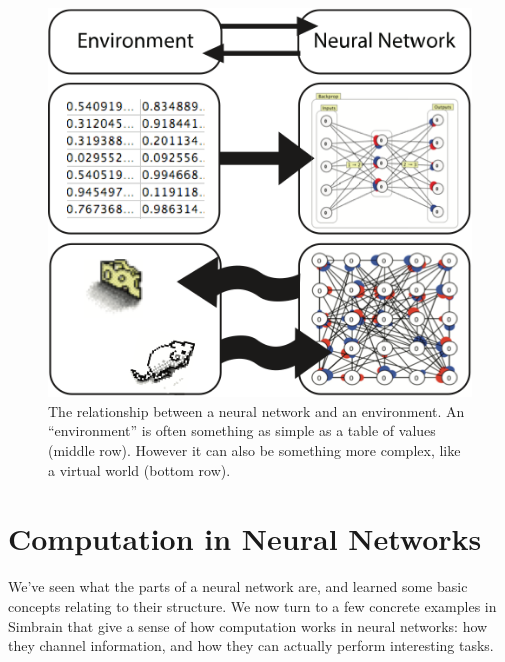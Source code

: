 \begin{figure}[h]
\centering
\includegraphics[scale=.7]{./images/nn_environment.png}
\caption[Pamela Payne.]{The relationship between a neural network and an environment. An ``environment'' is often something as simple as a table of values (middle row). However it can also be something more complex, like a virtual world (bottom row).}
\label{nn_environment}
\end{figure}

\section{Computation in Neural Networks}\label{intro_comp_nn}

We've seen what the parts of a neural network are, and learned some basic concepts relating to their structure. We now turn to a few concrete examples in Simbrain that give a sense of how computation works in neural networks: how they channel information, and how they can actually perform interesting tasks. 

